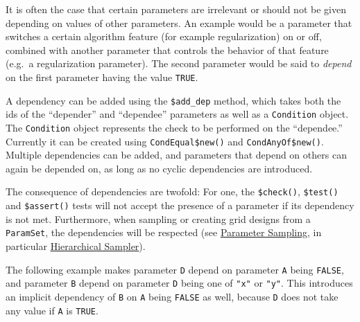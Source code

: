 \documentclass[
]{scrbook}
\newenvironment{Shaded}{\begin{snugshade}}{\end{snugshade}}
\newcommand{\ConstantTok}[1]{\textcolor[rgb]{0.00,0.00,0.00}{#1}}
\newcommand{\FunctionTok}[1]{\textcolor[rgb]{0.00,0.00,0.00}{#1}}
\newcommand{\NormalTok}[1]{#1}
\newcommand{\SpecialCharTok}[1]{\textcolor[rgb]{0.00,0.00,0.00}{#1}}
\newcommand{\StringTok}[1]{\textcolor[rgb]{0.31,0.60,0.02}{#1}}
\renewenvironment{Shaded} {\begin{snugshade}\small} {\end{snugshade}}
\begin{document}
It is often the case that certain parameters are irrelevant or should not be given depending on values of other parameters.
An example would be a parameter that switches a certain algorithm feature (for example regularization) on or off, combined with another parameter that controls the behavior of that feature (e.g.~a regularization parameter).
The second parameter would be said to \emph{depend} on the first parameter having the value \texttt{TRUE}.

A dependency can be added using the \texttt{\$add\_dep} method, which takes both the ids of the ``depender'' and ``dependee'' parameters as well as a \texttt{Condition} object.
The \texttt{Condition} object represents the check to be performed on the ``dependee.''
Currently it can be created using \texttt{CondEqual\$new()} and \texttt{CondAnyOf\$new()}.
Multiple dependencies can be added, and parameters that depend on others can again be depended on, as long as no cyclic dependencies are introduced.

The consequence of dependencies are twofold:
For one, the \texttt{\$check()}, \texttt{\$test()} and \texttt{\$assert()} tests will not accept the presence of a parameter if its dependency is not met.
Furthermore, when sampling or creating grid designs from a \texttt{ParamSet}, the dependencies will be respected (see \protect\hyperlink{parameter-sampling}{Parameter Sampling}, in particular \protect\hyperlink{hierarchical-sampler}{Hierarchical Sampler}).

The following example makes parameter \texttt{D} depend on parameter \texttt{A} being \texttt{FALSE}, and parameter \texttt{B} depend on parameter \texttt{D} being one of \texttt{"x"} or \texttt{"y"}.
This introduces an implicit dependency of \texttt{B} on \texttt{A} being \texttt{FALSE} as well, because \texttt{D} does not take any value if \texttt{A} is \texttt{TRUE}.

\begin{Shaded}
\end{Shaded}
\end{document}
